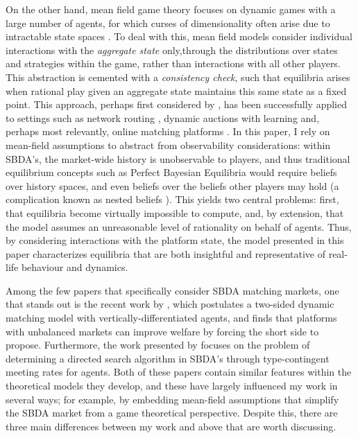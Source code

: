 On the other hand, mean field game theory focuses on dynamic games with a large number of agents, for which curses of dimensionality often arise due to intractable state spaces \citep{maskin2001markov}.
To deal with this, mean field models consider individual interactions with the \textit{aggregate state} only,through the distributions over states and strategies within the game, rather than interactions with all other players.
This abstraction is cemented with a \textit{consistency check}, such that equilibria arises when rational play given an aggregate state maintains this same state as a fixed point. 
This approach, perhaps first considered by \cite{jovanovic1988anonymous}, has been successfully applied to settings such as network routing \citep{calderone2017markov}, dynamic auctions with learning \citep{iyer2014mean} and, perhaps most relevantly, online matching platforms \citep{kanoria2021facilitating,immorlica2021designing}.
In this paper, I rely on mean-field assumptions to abstract from observability considerations: within SBDA's, the market-wide history is unobservable to players, and thus traditional equilibrium concepts such as Perfect Bayesian Equilibria would require beliefs over history spaces, and even beliefs over the beliefs other players may hold (a complication known as nested beliefs \citep{brandenburger1993hierarchies}).
This yields two central problems: first, that equilibria become virtually impossible to compute, and, by extension, that the model assumes an unreasonable level of rationality on behalf of agents.
Thus, by considering interactions with the platform state, the model presented in this paper characterizes equilibria that are both insightful and representative of real-life behaviour and dynamics.


Among the few papers that specifically consider SBDA matching markets, one that stands out is the recent work by \cite{kanoria2021facilitating}, which postulates a two-sided dynamic matching model with vertically-differentiated agents, and finds that platforms with unbalanced markets can improve welfare by forcing the short side to propose. Furthermore, the work presented by \cite{immorlica2021designing} focuses on the problem of determining a directed search algorithm in SBDA's through type-contingent meeting rates for agents. Both of these papers contain similar features within the theoretical models they develop, and these have largely influenced my work in several ways; for example, by embedding mean-field assumptions that simplify the SBDA market from a game theoretical perspective. Despite this, there are three main differences between my work and above that are worth discussing. 


